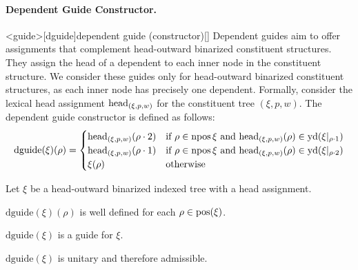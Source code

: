 \documentclass[../../document.tex]{subfiles}
\begin{document}
    \paragraph{Dependent Guide Constructor.}<guide>[dguide]{dependent guide (constructor)}[]
    Dependent guides aim to offer assignments that complement head-outward binarized constituent structures.
    They assign the head of a dependent to each inner node in the constituent structure.
    We consider these guides only for head-outward binarized constituent structures, as each inner node has precisely one dependent.
    Formally, consider the lexical head assignment \(\operatorname{head}_{(\xi,p,w)}\) for the constituent tree \((\xi, p, w)\).
    The dependent guide constructor is defined as follows:
    \[
        \mathrm{dguide}(\xi)(\rho) = \begin{cases}
            \operatorname{head}_{(\xi,p,w)}(\rho\cdot2) & \text{if $\rho \in \operatorname{npos}{\xi}$ and $\operatorname{head}_{(\xi,p,w)}(\rho) \in \operatorname{yd}(\xi|_{\rho\cdot 1})$} \\
            \operatorname{head}_{(\xi,p,w)}(\rho\cdot1) & \text{if $\rho \in \operatorname{npos}{\xi}$ and $\operatorname{head}_{(\xi,p,w)}(\rho) \in \operatorname{yd}(\xi|_{\rho\cdot 2})$} \\
            \xi(\rho) & \text{otherwise} \\
        \end{cases}
    \]

    \begin{claim}
        Let \(\xi\) be a head-outward binarized indexed tree with a head assignment.
        \begin{compactenum}
            \item \(\mathrm{dguide}(\xi)(\rho)\) is well defined for each \(\rho \in \operatorname{pos}(\xi)\).
            \item \(\mathrm{dguide}(\xi)\) is a guide for \(\xi\).
            \item \(\mathrm{dguide}(\xi)\) is unitary and therefore admissible.
        \end{compactenum}
    \end{claim}
\end{document}
